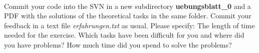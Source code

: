 \\
Commit your code into the SVN in a new subdirectory 
\textbf{uebungsblatt\_0\ExerciseSheetNumber} and a PDF with the solutions of the 
theoretical tasks in the same folder. Commit your feedback in a text file 
\emph{erfahrungen.txt} as usual. Please specify: The length of time needed for 
the exercise. Which tasks have been difficult for you and where did you have 
problems? How much time did you spend to solve the problems?
